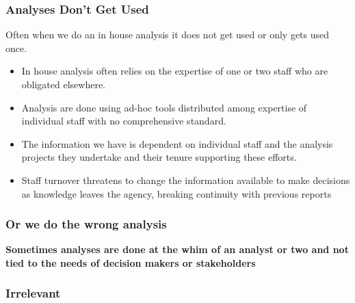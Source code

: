 \documentclass{beamer}
\begin{document}
\begin{frame}
\frametitle{Analyses Don't Get Used}
Often when we do an in house analysis it does not get used or only gets used once.
  \begin{itemize}
  \item In house analysis often relies on the expertise of one or two staff who are obligated elsewhere. 
  \pause
  \item Analysis are done using ad-hoc tools distributed among expertise of individual staff with no comprehensive standard. 
  \pause
  \item The information we have is dependent on individual staff and the analysis projects they undertake and their tenure supporting these efforts.
  \pause
  \item Staff turnover threatens to change the information available to make decisions as knowledge leaves the agency, breaking continuity with previous reports
  \pause
  \end{itemize}
\end{frame}

\begin{frame}
\frametitle{Or we do the wrong analysis}
\begin{center}
\Huge \textbf{Sometimes analyses are done at the whim of an analyst or two and not tied to the needs of decision makers or stakeholders}
\end{center}
\end{frame}

{
\begin{frame}[plain]
\frametitle{Irrelevant}
\end{frame}
}
\end{document}
